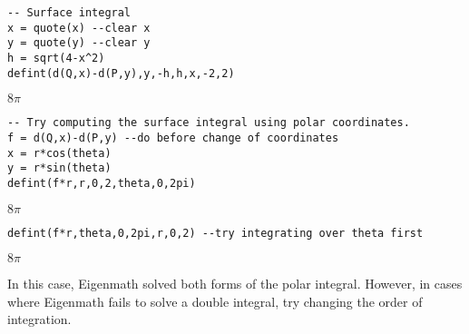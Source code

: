 \begin{Verbatim}[formatcom=\color{blue},samepage=true]
-- Surface integral
x = quote(x) --clear x
y = quote(y) --clear y
h = sqrt(4-x^2)
defint(d(Q,x)-d(P,y),y,-h,h,x,-2,2)
\end{Verbatim}

$\displaystyle 8\pi$

\begin{Verbatim}[formatcom=\color{blue},samepage=true]
-- Try computing the surface integral using polar coordinates.
f = d(Q,x)-d(P,y) --do before change of coordinates
x = r*cos(theta)
y = r*sin(theta)
defint(f*r,r,0,2,theta,0,2pi)
\end{Verbatim}

$\displaystyle 8\pi$

\begin{Verbatim}[formatcom=\color{blue},samepage=true]
defint(f*r,theta,0,2pi,r,0,2) --try integrating over theta first
\end{Verbatim}

$\displaystyle 8\pi$

In this case, Eigenmath solved both forms of the polar integral.
However, in cases where Eigenmath fails to solve a double integral, try
changing the order of integration.
